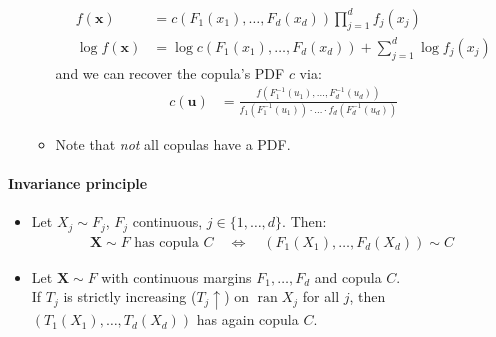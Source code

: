 \documentclass[a4paper,landscape,8pt,fleqn]{scrartcl}
\DeclareMathOperator{\ran}{ran}				%
\begin{document}
\begin{multicols*}{3}
\begin{itemize}
\begin{itemize}
\begin{align*}
f(\bm x) &= c(F_1(x_1), \ldots, F_d(x_d)) \prod_{j=1}^d f_j(x_j) \\
\log f(\bm x) &= \log c(F_1(x_1), \ldots, F_d(x_d)) + \sum_{j=1}^d \log f_j(x_j)
\end{align*}
and we can recover the copula's PDF $c$ via:
\begin{align*}
c(\bm u) &= \frac{f(F_1^{-1}(u_1), \ldots, F_d^{-1}(u_d))}{f_1(F_1^{-1}(u_1)) \cdot \ldots \cdot f_d(F_d^{-1}(u_d))}
\end{align*}
\item Note that \textit{not} all copulas have a PDF.
\end{itemize}
\end{itemize}

\paragraph{Invariance principle}
\begin{itemize}
\item Let $X_j \sim F_j$, $F_j$ continuous, $j \in \lbrace 1, \ldots, d \rbrace$. Then:
\begin{align*}
\bm X \sim F \text{ has copula } C \quad \iff \quad  (F_1(X_1), \ldots, F_d(X_d)) \sim C
\end{align*}
\item Let $\bm X \sim F$ with continuous margins $F_1, \ldots, F_d$ and copula $C$. \\
If $T_j$ is strictly increasing ($T_j \uparrow$) on $\ran X_j$ for all $j$, then $(T_1(X_1), \ldots, T_d(X_d))$ has again copula $C$.
\end{itemize}


\end{multicols*}
\end{document}
